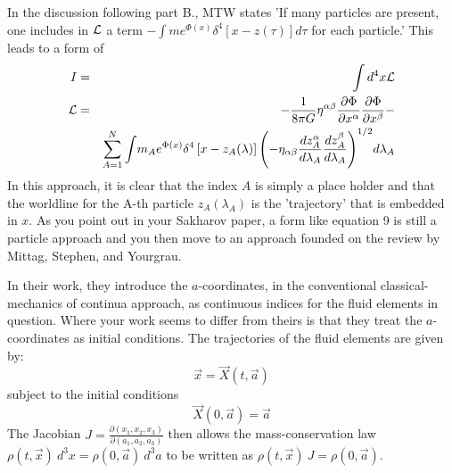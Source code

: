 \documentclass{article}
\begin{document}
In the discussion following part B., MTW states 'If many particles are present, one includes in ${\cal L}$ a term $-\int m e^{\Phi(x)}\delta^4 \left[x - z(\tau)\right] d\tau$ for each particle.'  This leads to a form of
\begin{eqnarray}
I &  = & \int d^4x {\cal L} \\
{\cal L} & = & -\frac{1}{8 \pi G} \eta^{\alpha \beta} \frac{\partial \Phi}{\partial x^{\alpha}}\frac{\partial \Phi}{\partial x^{\beta}} - \nonumber \\ & & \sum_{A=1}^{N} \int \! m_{A} e^{\Phi(x)} \delta^4 \left[ x - z_{A}(\lambda) \right] \left( -\eta_{\alpha \beta}\frac{dz_{A}^{\alpha}}{d\lambda_{A}}\frac{dz_{A}^{\beta}}{d\lambda_{A}}\right)^{1/2}\! d\lambda_{A}
\end{eqnarray}
In this approach, it is clear that the index $A$ is simply a place holder and that the worldline for the A-th particle $z_{A}(\lambda_{A})$ is the 'trajectory' that is embedded in $x$.  As you point out in your Sakharov paper, a form like equation 9 is still a particle approach and you then move to an approach founded on the review by Mittag, Stephen, and Yourgrau.

In their work, they introduce the $a$-coordinates, in the conventional classical-mechanics of continua approach, as continuous indices for the fluid elements in question.  Where your work seems to differ from theirs is that they treat the $a$-coordinates as initial conditions.  The trajectories of the fluid elements are given by:
\begin{equation}
{\vec x}  =  {\vec X}(t,{\vec a})
\end{equation}
subject to the initial conditions
\begin{equation}
{\vec X}(0,{\vec a}) = {\vec a}
\end{equation}
The Jacobian $J = \frac{\partial(x_{1},x_{2},x_{3})}{\partial(a_{1},a_{2},a_{3})}$ then allows the mass-conservation law $\rho(t,{\vec x}) \ d^3x = \rho(0,{\vec a}) \ d^3a$ to be written as $\rho(t,{\vec x}) \ J = \rho(0,{\vec a})$.
\end{document}
